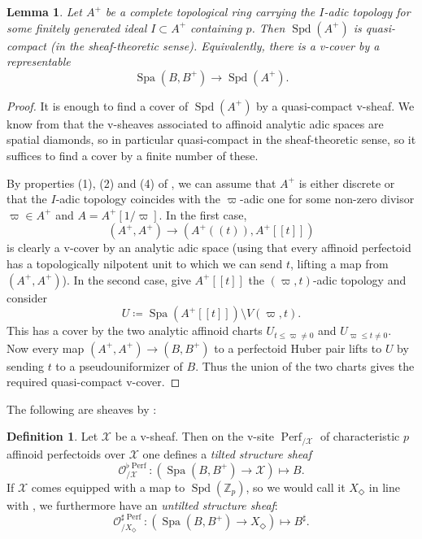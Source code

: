 \documentclass[10pt,twoside]{article}
\numberwithin{equation}{section}
\theoremstyle{plain}
\newtheorem{mylemma}[mythm]{Lemma}
\theoremstyle{definition}
\newtheorem{mydef}[mythm]{Definition}
\DeclareMathOperator{\Spa}{Spa}
\DeclareMathOperator{\Spd}{Spd}
\DeclareMathOperator{\Perf}{Perf}
\newcommand{\ZZ}{\mathbb{Z}}
\newcommand{\MCO}{\mathcal{O}}
\newcommand{\MCX}{\mathcal{X}}
\let \diamond \Diamond
\begin{document}
\begin{mylemma}\label{coverByRepresentable}
Let \(A^+\) be a complete topological ring carrying the \(I\)-adic topology for some finitely generated ideal \(I\subset A^+\) containing \(p\). Then \(\Spd(A^+)\) is quasi-compact (in the sheaf-theoretic sense). Equivalently, there is a v-cover by a representable
\[\Spa(B,B^+)\longrightarrow \Spd(A^+).\]
\end{mylemma}


\begin{proof}
    It is enough to find a cover of \(\Spd(A^+)\) by a quasi-compact v-sheaf. We know from \cite[Chapter 15]{etCohDiamonds} that the v-sheaves associated to affinoid analytic adic spaces are spatial diamonds, so in particular quasi-compact in the sheaf-theoretic sense, so it suffices to find a cover by a finite number of these.\par
    By properties (1), (2) and (4) of , we can assume that \(A^+\) is either discrete or that the \(I\)-adic topology coincides with the \(\varpi\)-adic one for some non-zero divisor \(\varpi\in A^+\) and \(A=A^+[1/\varpi]\). In the first case,
    \[(A^+,A^+)\longrightarrow(A^+((t)),A^+[[t]])\] is clearly a v-cover by an analytic adic space (using that every affinoid perfectoid has a topologically nilpotent unit to which we can send \(t\), lifting a map from \((A^+,A^+)\)). In the second case, give \(A^+[[t]]\) the \((\varpi,t)\)-adic topology and consider
    \[U\coloneqq\Spa(A^+[[t]])\setminus V(\varpi,t).\]
    This has a cover by the two analytic affinoid charts \(U_{t\leq\varpi\neq0}\) and \(U_{\varpi\leq t\neq0}\). Now every map \((A^+,A^+)\to(B,B^+)\) to a perfectoid Huber pair lifts to \(U\) by sending \(t\) to a pseudouniformizer of \(B\). Thus the union of the two charts gives the required quasi-compact v-cover.
\end{proof}



The following are sheaves by \cite[Theorem 17.1.3]{SW20}:


\begin{mydef}\label{defVSheaf}
    Let \(\MCX\) be a v-sheaf. Then on the v-site \(\Perf_{/\MCX}\) of characteristic \(p\) affinoid perfectoids over \(\MCX\) one defines a \emph{tilted structure sheaf}
    \[\MCO^{\flat\Perf}_{/\MCX}\colon (\Spa(B,B^+)\to \MCX)\mapsto B.\]
    If \(\MCX\) comes equipped with a map to \(\Spd(\ZZ_p)\), so we would call it \(X_\diamond\) in line with , we furthermore have an \emph{untilted structure sheaf}:
        \[\MCO^{\sharp\Perf}_{/X_\diamond}\colon (\Spa(B,B^+)\to X_{\diamond})\mapsto B^\sharp.\]
\end{mydef}
\end{document}
